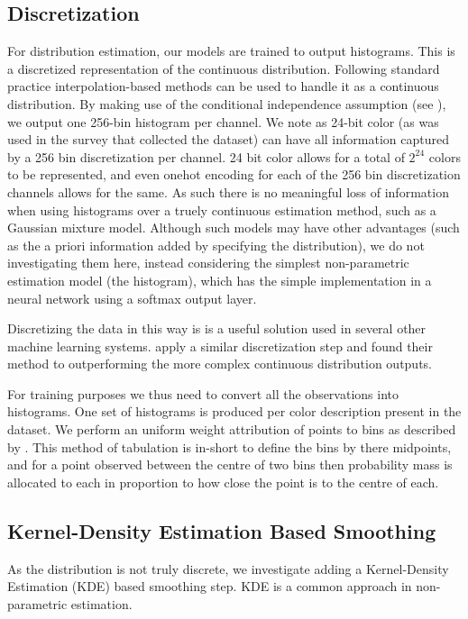 \documentclass[11pt,a4paper]{article}
\newcommand{\textcite}{\citet}
\begin{document}
\subsection{Discretization}\label{sec:discretization}
For distribution estimation, our models are trained to output histograms.
This is a discretized representation of the continuous distribution.
Following standard practice interpolation-based methods can be used to handle it as a continuous distribution.
By making use of the conditional independence assumption (see ), we output one 256-bin histogram per channel.
We note as  24-bit color (as was used in the survey that collected the dataset) can have all information captured by a 256 bin discretization  per channel.
24 bit color allows for a total of $2^{24}$ colors to be represented, and even onehot encoding for each of the 256 bin discretization channels allows for the same.
As such there is no meaningful loss of information when using histograms over a truely continuous estimation method, such as a Gaussian mixture model.
Although such models may have other advantages (such as the a priori information added by specifying the distribution), we do not investigating them here, instead considering the simplest non-parametric estimation model (the histogram), which has the simple implementation in a neural network using a softmax output layer.


Discretizing the data in this way is is a useful solution used in several other machine learning systems.
\textcite{oord2016pixel, DBLP:journals/corr/OordDZSVGKSK16} apply a similar discretization step and found their method to outperforming the more complex continuous distribution outputs.

For training purposes we thus need to convert all the observations into histograms.
One set of histograms is produced per color description present in the dataset.
We perform an uniform weight attribution of points to bins as described by \textcite{jones1984remark}. This method of tabulation is in-short to define the bins by there midpoints, and for a point observed between the centre of two bins then probability mass is allocated to each in proportion to how close the point is to the centre of each.

\subsection{Kernel-Density Estimation Based Smoothing}\label{sec:kernel-density-based-smoothing}
As the distribution is not truly discrete, we investigate adding a Kernel-Density Estimation (KDE) based smoothing step.
KDE is a common approach in non-parametric estimation.
\end{document}
